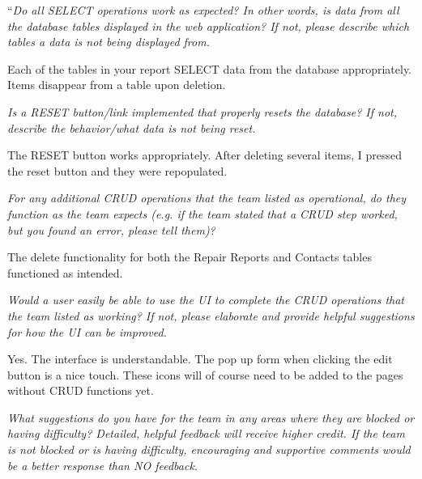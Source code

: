 \documentclass{article}
\begin{document}
\vspace{0.5cm}
\begin{tcolorbox}[colback=secondarycolor, colframe=primarycolor, title=\textbf{Step 4: Peer Review 2 - Jacob Hopkins}]
``\textit{Do all SELECT operations work as expected? In other words, is data from all the database tables displayed in the web application? If not, please describe which tables a data is not being displayed from.}

\vspace{0.05cm}
Each of the tables in your report SELECT data from the database appropriately. Items disappear from a table upon deletion.

\vspace{0.2cm}
\textit{Is a RESET button/link implemented that properly resets the database? If not, describe the behavior/what data is not being reset.}

\vspace{0.05cm}
The RESET button works appropriately. After deleting several items, I pressed the reset button and they were repopulated.

\vspace{0.2cm}
\textit{For any additional CRUD operations that the team listed as operational, do they function as the team expects (e.g. if the team stated that a CRUD step worked, but you found an error, please tell them)?}

\vspace{0.05cm}
The delete functionality for both the Repair Reports and Contacts tables functioned as intended.

\vspace{0.2cm}
\textit{Would a user easily be able to use the UI to complete the CRUD operations that the team listed as working? If not, please elaborate and provide helpful suggestions for how the UI can be improved.}

\vspace{0.05cm}
Yes. The interface is understandable. The pop up form when clicking the edit button is a nice touch. These icons will of course need to be added to the pages without CRUD functions yet.

\vspace{0.2cm}
\textit{What suggestions do you have for the team in any areas where they are blocked or having difficulty? Detailed, helpful feedback will receive higher credit. If the team is not blocked or is having difficulty, encouraging and supportive comments would be a better response than NO feedback.}


\end{tcolorbox}
\end{document}
